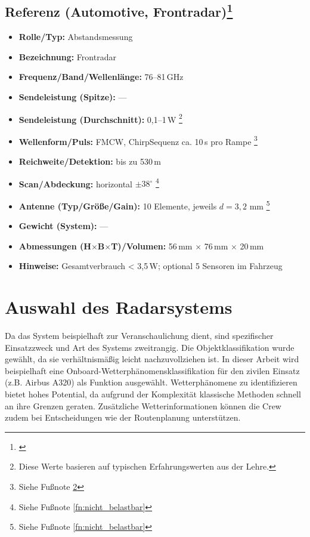 \subsection*{Referenz (Automotive, Frontradar)\footnote{ \parencite{Bosch_FrontRadar_2025}}}
\begin{itemize}
  \item \textbf{Rolle/Typ:} Abstandsmessung
  \item \textbf{Bezeichnung:} Frontradar
  \item \textbf{Frequenz/Band/Wellenlänge:} 76–81\,GHz
  \item \textbf{Sendeleistung (Spitze):} ---
  \item \textbf{Sendeleistung (Durchschnitt):}  0{,}1–1\,W \footnote{ \label{fn:typisch} Diese Werte basieren auf typischen Erfahrungswerten aus der Lehre.}
  \item \textbf{Wellenform/Puls:}  FMCW, Chirp\-Sequenz ca. 10\,\textmu s pro Rampe \footnote{Siehe Fußnote \ref{fn:typisch}}
  \item \textbf{Reichweite/Detektion:} bis zu 530\,m
  \item \textbf{Scan/Abdeckung:}  horizontal \(\pm 38^\circ\) \footnote{Siehe Fußnote \ref{fn:nicht_belastbar}}
  \item \textbf{Antenne (Typ/Größe/Gain):}  10 Elemente, jeweils \(d=3{,}2\) mm \footnote{Siehe Fußnote \ref{fn:nicht_belastbar}}
  \item \textbf{Gewicht (System):} ---
  \item \textbf{Abmessungen (H\(\times\)B\(\times\)T)/Volumen:} 56\,mm \(\times\) 76\,mm \(\times\) 20\,mm
  \item \textbf{Hinweise:} Gesamtverbrauch < 3{,}5\,W; optional 5 Sensoren im Fahrzeug
\end{itemize}



\section{Auswahl des Radarsystems}
Da das System beispielhaft zur Veranschaulichung dient, sind spezifischer Einsatzzweck und Art des Systems zweitrangig. 
Die Objektklassifikation wurde gewählt, da sie verhältnismäßig leicht nachzuvollziehen ist. 
In dieser Arbeit wird beispielhaft eine Onboard-Wetterphänomensklassifikation für den zivilen Einsatz (z.B. Airbus A320) 
als Funktion ausgewählt. Wetterphänomene zu identifizieren bietet hohes Potential, da aufgrund der Komplexität 
klassische Methoden schnell an ihre Grenzen geraten. 
Zusätzliche Wetterinformationen können die Crew zudem bei Entscheidungen wie der Routenplanung unterstützen.

